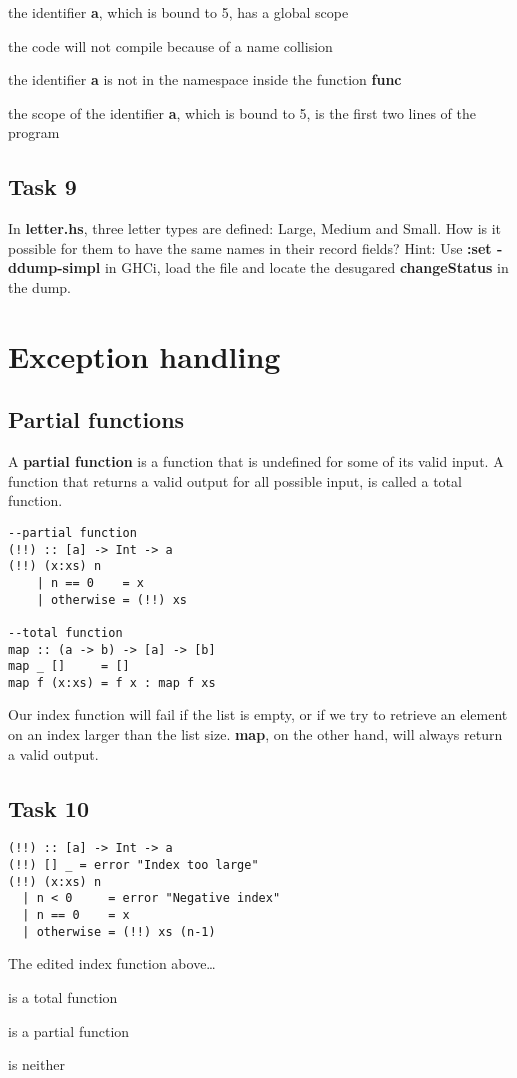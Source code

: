 \documentclass{article}
\begin{document}
\begin{deloppgaver}
    \item the identifier \textbf{a}, which is bound to 5, has a global scope
    \item the code will not compile because of a name collision
    \item the identifier \textbf{a} is not in the namespace inside the function \textbf{func}
    \item the scope of the identifier \textbf{a}, which is bound to 5, is the first two lines of the program
\end{deloppgaver}

\subsection*{Task 9}
In \textbf{letter.hs}, three letter types are defined: Large, Medium and Small. How is it possible for them to have the same names in their record fields?
Hint: Use \textbf{:set -ddump-simpl} in GHCi, load the file and locate the desugared \textbf{changeStatus} in the dump.

\section{Exception handling}

\subsection*{Partial functions}
A \textbf{partial function} is a function that is undefined for some of its valid input. A function that returns a valid output for all possible input, is called a total function.
\lstset{language=Haskell}
\begin{lstlisting}
--partial function
(!!) :: [a] -> Int -> a
(!!) (x:xs) n
    | n == 0    = x
    | otherwise = (!!) xs
    
--total function
map :: (a -> b) -> [a] -> [b]
map _ []     = []
map f (x:xs) = f x : map f xs
\end{lstlisting}
Our index function will fail if the list is empty, or if we try to retrieve an element on an index larger than the list size. \textbf{map}, on the other hand, will always return a valid output.
\subsection*{Task 10}
\begin{lstlisting}
(!!) :: [a] -> Int -> a
(!!) [] _ = error "Index too large"
(!!) (x:xs) n
  | n < 0     = error "Negative index"
  | n == 0    = x 
  | otherwise = (!!) xs (n-1)
\end{lstlisting}
The edited index function above\ldots
\begin{deloppgaver}
    \item is a total function
    \item is a partial function
    \item is neither
\end{deloppgaver}
\end{document}
